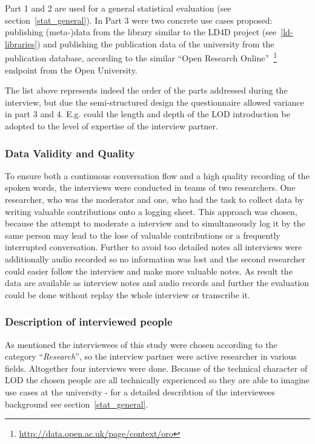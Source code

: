 Part 1 and 2 are used for a general statistical evaluation (see section~\ref{stat_general}). In Part 3 were two concrete use cases proposed: publishing (meta-)data from the library similar to the LD4D project (see~\ref{ld-libraries}) and publishing the publication data of the university from the publication database, according to the similar ``Open Research Online''~\footnote{\url{http://data.open.ac.uk/page/context/oro}} endpoint from the Open University.

The list above represents indeed the order of the parts addressed during the interview, but due the semi-structured design the questionnaire allowed variance in part 3 and 4. E.g. could the length and depth of the LOD introduction be adopted to the level of expertise of the interview partner.

\subsubsection{Data Validity and Quality}
To ensure both a continuous conversation flow and a high quality recording of the spoken words, the interviews were conducted in teams of two researchers. One researcher, who was the moderator and one, who had the task to collect data by writing valuable contributions onto a logging sheet. This approach was chosen, because the attempt to moderate a interview and to simultaneously log it by the same person may lead to the lose of valuable contributions or a frequently interrupted conversation. Further to avoid too detailed notes all interviews were additionally audio recorded so no information was lost and the second researcher could easier follow the interview and make more valuable notes.
As result the data are available as interview notes and audio records and further the evaluation could be done without replay the whole interview or transcribe it.

\subsubsection{Description of interviewed people}
As mentioned the interviewees of this study were chosen according to the category ``\textit{Research}'', so the interview partner were active researcher in various fields. Altogether four interviews were done. Because of the technical character of LOD the chosen people are all technically experienced so they are able to imagine use cases at the university - for a detailed describtion of the interviewees background see section~\ref{stat_general}.